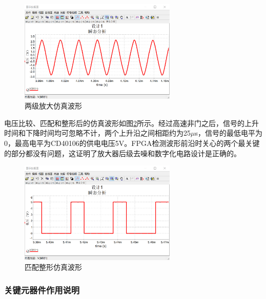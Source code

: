 \documentclass[a4paper, twocolumn]{ctexart}
\begin{document}
\begin{figure}[h]
    \centering
    \includegraphics[width=7.5cm]{../assets/两级放大仿真波形.png}
    \caption{两级放大仿真波形}
    \label{fig:rec_sim_amp}
\end{figure}

电压比较、匹配和整形后的仿真波形如图\ref{fig:rec_sim_CD40106}所示。经过高速非门之后，信号的上升时间和下降时间均可忽略不计，两个上升沿之间相距约为25$\mu$s，信号的最低电平为0，最高电平为CD40106的供电电压5V。FPGA检测波形前沿时关心的两个最关键的部分都没有问题，这证明了放大器后级去噪和数字化电路设计是正确的。

\begin{figure}[h]
    \centering
    \includegraphics[width=7.5cm]{../assets/匹配整形仿真波形.png}
    \caption{匹配整形仿真波形}
    \label{fig:rec_sim_CD40106}
\end{figure}

\subsubsection{关键元器件作用说明}
\end{document}
